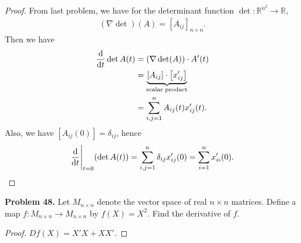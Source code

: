 \documentclass[12pt,leqno]{amsart}
\theoremstyle{definition}
\begin{document}
\begin{proof}
From last problem, we have for the determinant function $\det: \mathbb{R}^{n^2} \to \mathbb{R}$,
\begin{align*}
    (\nabla \det)(A) = \left[A_{ij}\right]_{n\times n}.
\end{align*}
Then we have 
\begin{align*}
    \dv{}{t} \det A(t) & = (\nabla \det(A))\cdot A'(t) \\
    & =  \underbrace{\left[A_{ij}\right]\cdot \left[x_{ij}'\right]}_{\text{scalar product}} \\
    & = \sum^n_{i,j = 1} A_{ij}(t) x_{ij}'(t).
\end{align*}
Also, we have $\left[A_{ij}(0)\right] = \delta_{ij}$, hence 
\begin{align*}
    \dv{}{t}\Bigg|_{t=0}(\det A(t)) = \sum^n_{i,j = 1} \delta_{ij} x_{ij}'(0) = \sum_{i=1}^n x_{ii}'(0).
\end{align*}
\end{proof}


\medskip

\noindent
{\bf Problem 48.}
Let $M_{n\times n}$ denote the vector space of real $n\times n$ matrices.
Define a map $f:M_{n\times n}\to M_{n\times n}$ by $f(X)=X^2$.
Find the derivative of $f$.
\begin{proof}
$Df(X) = X' X + X X'$.
\end{proof}

\medskip
\end{document}
